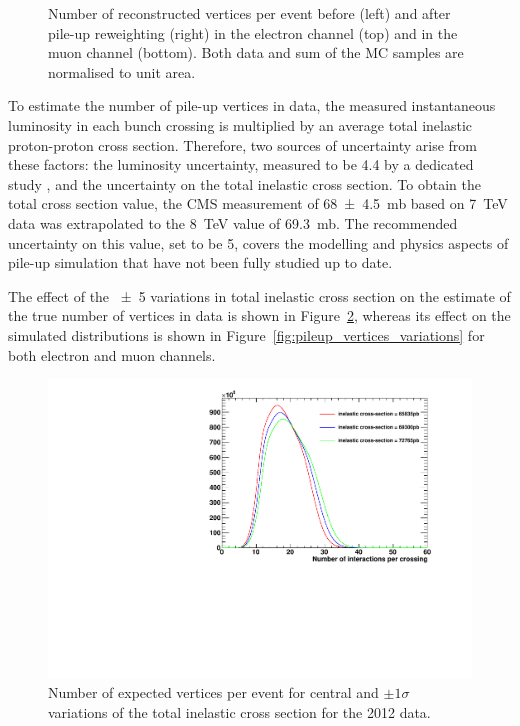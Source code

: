 \begin{figure}[!htpb]
	\caption{\label{fig:pileup_vertices}
    Number of reconstructed vertices per event before (left) and after pile-up reweighting (right) in the electron
    channel (top) and in the muon channel (bottom). Both data and sum of the MC samples are normalised to unit area.}
\end{figure}

To estimate the number of pile-up vertices in data, the measured instantaneous luminosity in each bunch crossing is
multiplied by an average total inelastic proton-proton cross section. Therefore, two sources of uncertainty arise from
these factors: the luminosity uncertainty, measured to be \SI{4.4}{\pc} by a dedicated study \autocite{CMS_lumi_2012},
and the uncertainty on the total inelastic cross section. To obtain the total cross section value, the CMS measurement
of \SI{68\pm4.5}{\milli\barn} based on \SI{7}{\TeV} data \autocite{CMS_total_inelastic_7TeV} was extrapolated to the
\SI{8}{\TeV} value of \SI{69.3}{\milli\barn}. The recommended uncertainty on this value, set to be \SI{5}{\pc}, covers
the modelling and physics aspects of pile-up simulation that have not been fully studied up to date.


The effect of the \SI{\pm5}{\pc} variations in total inelastic cross section on the estimate of the true number of
vertices in data is shown in Figure~\ref{fig:pileup_truth}, whereas its effect on the simulated distributions is shown
in Figure~\ref{fig:pileup_vertices_variations} for both electron and muon channels.

 \begin{figure}[htbp]
   	\centering
    \includegraphics[width=\textwidth]{vertices/PileUp_2012_truth_data.pdf}
    \caption{Number of expected vertices per event for central and $\pm1\sigma$ variations of the total inelastic cross
    section for the 2012 data.}
    \label{fig:pileup_truth}
 \end{figure}

